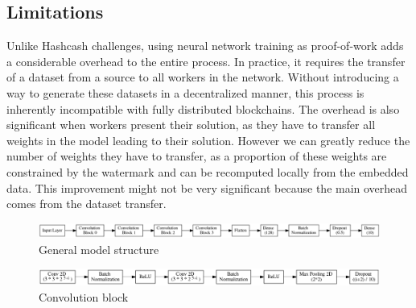 \documentclass{article}
\begin{document}
\begin{multicols}{2}
	\section{Limitations}

	Unlike Hashcash challenges, using neural network training as proof-of-work adds a considerable overhead to the entire process. In practice, it requires the transfer of a dataset from a source to all workers in the network. Without introducing a way to generate these datasets in a decentralized manner, this process is inherently incompatible with fully distributed blockchains.
	The overhead is also significant when workers present their solution, as they have to transfer all weights in the model leading to their solution. However we can greatly reduce the number of weights they have to transfer, as a proportion of these weights are constrained by the watermark and can be recomputed locally from the embedded data. This improvement might not be very significant because the main overhead comes from the dataset transfer.

\end{multicols}

\begin{appendices}

	\begin{figure}[h!]
		\centering
		\includegraphics[width=\textwidth]{assets/model.png}
		\caption{General model structure}
		\label{fig:modelstructure}
	\end{figure}

	\begin{figure}[h!]
		\centering
		\includegraphics[width=\textwidth]{assets/convblock.png}
		\caption{Convolution block}
		\label{fig:convblock}
	\end{figure}

\end{appendices}




\end{document}

